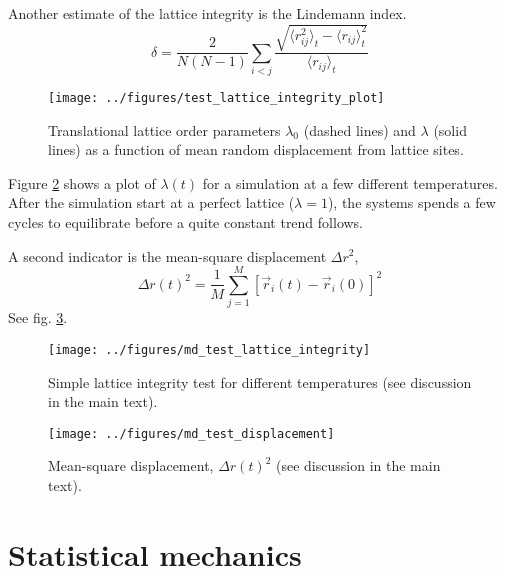 \documentclass[11pt,bibliography=totoc,index=totoc]{scrbook}   %
\begin{document}
Another estimate of the lattice integrity is the Lindemann index.\cite{Lindemann:1910}
\begin{equation}
  \delta = \frac{2}{N(N-1)} \sum_{i<j} \frac{\sqrt{\langle r_{ij}^2\rangle_t - \langle r_{ij} \rangle^2_t }}{ \langle r_{ij} \rangle_t }
  \label{eq:lindemannindex}
\end{equation}

\begin{figure}[htbp]
  \begin{center}
    \texttt{[image: ../figures/test\_lattice\_integrity\_plot]}
  \end{center}
  \caption{Translational lattice order parameters $\lambda_0$ (dashed lines) and $\lambda$ (solid lines) as a function of mean random displacement from lattice sites.}
  \label{fig:tlotest}
\end{figure}

Figure \ref{fig:md_test_lattice_integrity} shows a plot of $\lambda(t)$ for a simulation at a few different temperatures. 
After the simulation start at a perfect lattice ($\lambda=1$), the systems spends a few cycles to equilibrate before a quite constant trend follows.

A second indicator is the mean-square displacement $\Delta r^2$,
\begin{equation}
  \Delta r(t)^2 = \frac{1}{M}\sum_{j=1}^M [\vec{r}_i(t)-\vec{r}_i(0)]^2
\end{equation}
See fig. \ref{fig:md_test_displacement}.

\begin{figure}[htbp]
  \begin{center}
    \texttt{[image: ../figures/md\_test\_lattice\_integrity]}
  \end{center}
  \caption{Simple lattice integrity test for different temperatures (see discussion in the main text).}
  \label{fig:md_test_lattice_integrity}
\end{figure}

\begin{figure}[htbp]
  \begin{center}
    \texttt{[image: ../figures/md\_test\_displacement]}
  \end{center}
  \caption{Mean-square displacement, $\Delta r(t)^2$ (see discussion in the main text).}
  \label{fig:md_test_displacement}
\end{figure}


%
\section{Statistical mechanics}
%
\end{document}
